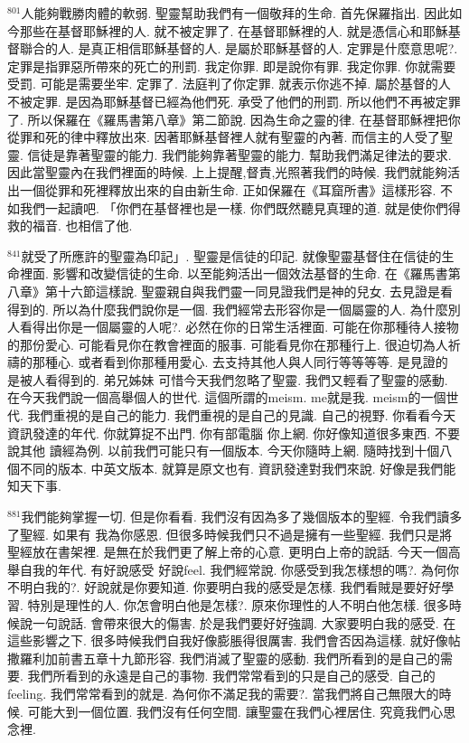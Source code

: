 \documentclass{book}
\begin{document}
$^{801}$人能夠戰勝肉體的軟弱.
聖靈幫助我們有一個敬拜的生命.
首先保羅指出.
因此如今那些在基督耶穌裡的人.
就不被定罪了.
在基督耶穌裡的人.
就是憑信心和耶穌基督聯合的人.
是真正相信耶穌基督的人.
是屬於耶穌基督的人.
定罪是什麼意思呢?.
定罪是指罪惡所帶來的死亡的刑罰.
我定你罪.
即是說你有罪.
我定你罪.
你就需要受罰.
可能是需要坐牢.
定罪了.
法庭判了你定罪.
就表示你逃不掉.
屬於基督的人不被定罪.
是因為耶穌基督已經為他們死.
承受了他們的刑罰.
所以他們不再被定罪了.
所以保羅在《羅馬書第八章》第二節說.
因為生命之靈的律.
在基督耶穌裡把你從罪和死的律中釋放出來.
因著耶穌基督裡人就有聖靈的內著.
而信主的人受了聖靈.
信徒是靠著聖靈的能力.
我們能夠靠著聖靈的能力.
幫助我們滿足律法的要求.
因此當聖靈內在我們裡面的時候.
上上提醒,督責,光照著我們的時候.
我們就能夠活出一個從罪和死裡釋放出來的自由新生命.
正如保羅在《耳窟所書》這樣形容.
不如我們一起讀吧.
「你們在基督裡也是一樣.
你們既然聽見真理的道.
就是使你們得救的福音.
也相信了他.

$^{841}$就受了所應許的聖靈為印記」.
聖靈是信徒的印記.
就像聖靈基督住在信徒的生命裡面.
影響和改變信徒的生命.
以至能夠活出一個效法基督的生命.
在《羅馬書第八章》第十六節這樣說.
聖靈親自與我們靈一同見證我們是神的兒女.
去見證是看得到的.
所以為什麼我們說你是一個.
我們經常去形容你是一個屬靈的人.
為什麼別人看得出你是一個屬靈的人呢?.
必然在你的日常生活裡面.
可能在你那種待人接物的那份愛心.
可能看見你在教會裡面的服事.
可能看見你在那種行上.
很迫切為人祈禱的那種心.
或者看到你那種用愛心.
去支持其他人與人同行等等等等.
是見證的 是被人看得到的.
弟兄姊妹 可惜今天我們忽略了聖靈.
我們又輕看了聖靈的感動.
在今天我們說一個高舉個人的世代.
這個所謂的meism.
me就是我.
meism的一個世代.
我們重視的是自己的能力.
我們重視的是自己的見識.
自己的視野.
你看看今天資訊發達的年代.
你就算捉不出門.
你有部電腦 你上網.
你好像知道很多東西.
不要說其他 讀經為例.
以前我們可能只有一個版本.
今天你隨時上網.
隨時找到十個八個不同的版本.
中英文版本.
就算是原文也有.
資訊發達對我們來說.
好像是我們能知天下事.

$^{881}$我們能夠掌握一切.
但是你看看.
我們沒有因為多了幾個版本的聖經.
令我們讀多了聖經.
如果有 我為你感恩.
但很多時候我們只不過是擁有一些聖經.
我們只是將聖經放在書架裡.
是無在於我們更了解上帝的心意.
更明白上帝的說話.
今天一個高舉自我的年代.
有好說感受 好說feel.
我們經常說.
你感受到我怎樣想的嗎?.
為何你不明白我的?.
好說就是你要知道.
你要明白我的感受是怎樣.
我們看賊是要好好學習.
特別是理性的人.
你怎會明白他是怎樣?.
原來你理性的人不明白他怎樣.
很多時候說一句說話.
會帶來很大的傷害.
於是我們要好好強調.
大家要明白我的感受.
在這些影響之下.
很多時候我們自我好像膨脹得很厲害.
我們會否因為這樣.
就好像帖撒羅利加前書五章十九節形容.
我們消滅了聖靈的感動.
我們所看到的是自己的需要.
我們所看到的永遠是自己的事物.
我們常常看到的只是自己的感受.
自己的feeling.
我們常常看到的就是.
為何你不滿足我的需要?.
當我們將自己無限大的時候.
可能大到一個位置.
我們沒有任何空間.
讓聖靈在我們心裡居住.
究竟我們心思念裡.
\end{document}
